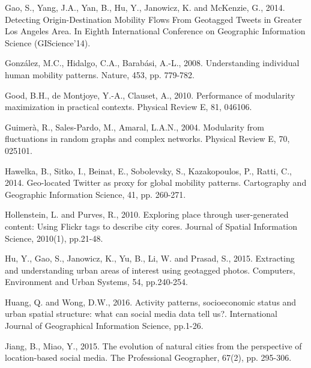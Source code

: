 \documentclass[]{tGIS2e}
\begin{document}
\begin{thebibliography}{9}
Gao, S., Yang, J.A., Yan, B., Hu, Y., Janowicz, K. and McKenzie, G., 2014. Detecting Origin-Destination Mobility Flows From Geotagged Tweets in Greater Los Angeles Area. In Eighth International Conference on Geographic Information Science (GIScience'14).

González, M.C., Hidalgo, C.A., Barabási, A.-L., 2008. Understanding individual human mobility patterns. Nature, 453, pp. 779-782.

Good, B.H., de Montjoye, Y.-A., Clauset, A., 2010. Performance of modularity maximization in practical contexts. Physical Review E, 81, 046106.

Guimerà, R., Sales-Pardo, M., Amaral, L.A.N., 2004. Modularity from fluctuations in random graphs and complex networks. Physical Review E, 70, 025101.

Hawelka, B., Sitko, I., Beinat, E., Sobolevsky, S., Kazakopoulos, P., Ratti, C., 2014. Geo-located Twitter as proxy for global mobility patterns. Cartography and Geographic Information Science, 41, pp. 260-271.

Hollenstein, L. and Purves, R., 2010. Exploring place through user-generated content: Using Flickr tags to describe city cores. Journal of Spatial Information Science, 2010(1), pp.21-48.

Hu, Y., Gao, S., Janowicz, K., Yu, B., Li, W. and Prasad, S., 2015. Extracting and understanding urban areas of interest using geotagged photos. Computers, Environment and Urban Systems, 54, pp.240-254.

Huang, Q. and Wong, D.W., 2016. Activity patterns, socioeconomic status and urban spatial structure: what can social media data tell us?. International Journal of Geographical Information Science, pp.1-26.

Jiang, B., Miao, Y., 2015. The evolution of natural cities from the perspective of location-based social media. The Professional Geographer, 67(2), pp. 295-306.


\end{thebibliography}
\end{document}
